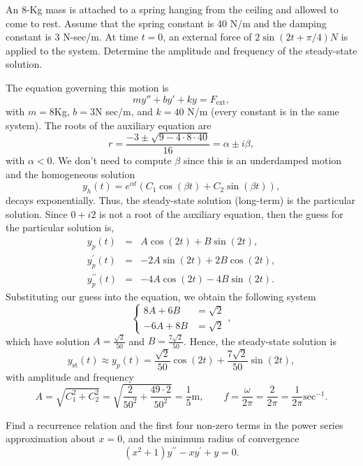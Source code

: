 \documentclass[11pt]{article}
\begin{document}
\begin{problem}
An 8-Kg mass is attached to a spring hanging from the ceiling and allowed to come to rest. Assume that the spring constant is 40 N/m and the damping constant is 3 N-sec/m. At time $t=0$, an external force of $2\sin(2t +\pi/4)N$ is applied to the system. Determine the amplitude and frequency of the steady-state solution.
\end{problem}
\begin{solution}
The equation governing this motion is $$my''+by'+ky=F_{\text{ext}},$$ with $m=8$Kg, $b=3$N sec/m, and $k=40$ N/m (every constant is in the same system). The roots of the auxiliary equation are
\[r=\frac{-3\pm \sqrt{9-4\cdot8\cdot 40}}{16}=\alpha \pm i \beta,\]
with $\alpha < 0$. We don't need to compute $\beta$ since this is an underdamped motion and the homogeneous solution
\[y_{h}(t)=e^{\alpha t}(C_{1}\cos(\beta t) +C_{2}\sin(\beta t)),\]
decays exponentially. Thus, the steady-state solution (long-term) is the particular solution. Since $0+i2$ is not a root of the auxiliary equation, then the guess for the particular solution is,
\begin{eqnarray*}
y_{p}(t) & = & A \cos(2t) + B \sin(2t) ,\\
y_{p}^{\prime}(t) &= &-2A \sin(2t) + 2B \cos(2t) ,\\
y_{p}^{\prime \prime}(t) &= & -4A \cos(2t) - 4B \sin(2t).
\end{eqnarray*}
Substituting our guess into the equation, we obtain the following system
\begin{equation*}\left\{
\begin{array}{cc}
8A + 6B &=\sqrt{2}\\
-6A + 8B &=\sqrt{2}
\end{array}\right. ,
\end{equation*}
which have solution $A=\frac{\sqrt{2}}{50}$ and $B=\frac{7\sqrt{2}}{50}$.
Hence, the steady-state solution is $$y_{\text{st}}(t)\approx y_{p}(t) = \frac{\sqrt{2}}{50}\cos(2t)+ \frac{7\sqrt{2}}{50}\sin(2t),$$
with amplitude and frequency 
\[\boxed{A=\sqrt{C_{1}^{2}+C_{2}^{2}}=\sqrt{\frac{2}{50^{2}}+\frac{49\cdot 2}{50^{2}}}=\frac{1}{5}\text{m}}, \qquad \boxed{f=\frac{\omega}{2\pi}=\frac{2}{2\pi}=\frac{1}{2\pi}\text{sec}^{-1}}.\]
\end{solution}





\begin{problem}
{Find a recurrence relation and the first four non-zero terms in the power series approximation about $x=0$, and the minimum radius of convergence}
\begin{equation*}
(x^2+1)y^{\prime \prime} - x y^{\prime} + y =0.
\end{equation*}
\end{problem}
\end{document}
